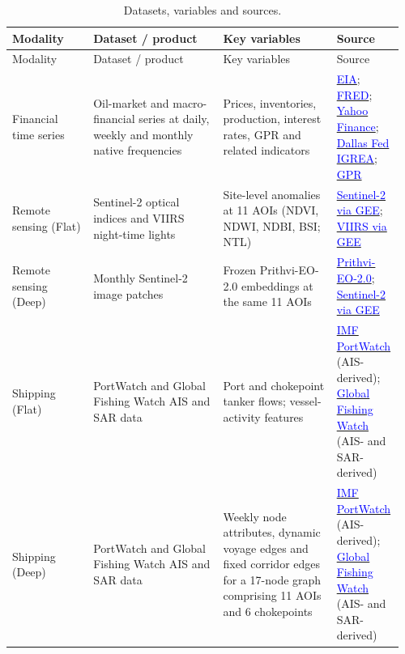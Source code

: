 \documentclass[
  british,
  12pt,
  oneside]{book}
\begin{document}
\begin{longtable}{@{}
  >{\raggedright\arraybackslash}p{0.20\linewidth}
  >{\raggedright\arraybackslash}p{0.32\linewidth}
  >{\raggedright\arraybackslash}p{0.28\linewidth}
  >{\raggedright\arraybackslash}p{0.16\linewidth}@{}}
\caption{\label{tab:datasets} Datasets, variables and sources.}\\
\toprule
Modality & Dataset / product & Key variables & Source \\
\midrule
\endfirsthead
\toprule
Modality & Dataset / product & Key variables & Source \\
\midrule
\endhead
\bottomrule
\endlastfoot
Financial time series & Oil-market and macro-financial series at daily, weekly and monthly native frequencies & Prices, inventories, production, interest rates, GPR and related indicators & \href{https://www.eia.gov/petroleum/supply/weekly/}{\textcolor{blue}{EIA}}; \href{https://fred.stlouisfed.org/}{\textcolor{blue}{FRED}}; \href{https://finance.yahoo.com/}{\textcolor{blue}{Yahoo Finance}}; \href{https://www.dallasfed.org/research/igrea}{\textcolor{blue}{Dallas Fed IGREA}}; \href{https://www.matteoiacoviello.com/gpr.htm}{\textcolor{blue}{GPR}} \\
\midrule
Remote sensing (Flat) & Sentinel-2 optical indices and VIIRS night-time lights & Site-level anomalies at 11 AOIs (NDVI, NDWI, NDBI, BSI; NTL) & \href{https://developers.google.com/earth-engine/datasets/catalog/COPERNICUS_S2_SR_HARMONIZED}{\textcolor{blue}{Sentinel-2 via GEE}}; \href{https://developers.google.com/earth-engine/datasets/catalog/NOAA_VIIRS_DNB_MONTHLY_V1_VCMSLCFG}{\textcolor{blue}{VIIRS via GEE}} \\
\midrule
Remote sensing (Deep) & Monthly Sentinel-2 image patches & Frozen Prithvi-EO-2.0 embeddings at the same 11 AOIs & \href{https://huggingface.co/ibm-nasa-geospatial}{\textcolor{blue}{Prithvi-EO-2.0}}; \href{https://developers.google.com/earth-engine/datasets/catalog/COPERNICUS_S2_SR_HARMONIZED}{\textcolor{blue}{Sentinel-2 via GEE}} \\
\midrule
Shipping (Flat) & PortWatch and Global Fishing Watch AIS and SAR data & Port and chokepoint tanker flows; vessel-activity features & \href{https://portwatch.imf.org/}{\textcolor{blue}{IMF PortWatch}} (AIS-derived); \href{https://globalfishingwatch.org/our-apis/}{\textcolor{blue}{Global Fishing Watch}} (AIS- and SAR-derived) \\
\midrule
Shipping (Deep) & PortWatch and Global Fishing Watch AIS and SAR data & Weekly node attributes, dynamic voyage edges and fixed corridor edges for a 17-node graph comprising 11 AOIs and 6 chokepoints & \href{https://portwatch.imf.org/}{\textcolor{blue}{IMF PortWatch}} (AIS-derived); \href{https://globalfishingwatch.org/our-apis/}{\textcolor{blue}{Global Fishing Watch}} (AIS- and SAR-derived) \\
\end{longtable}
\end{document}
